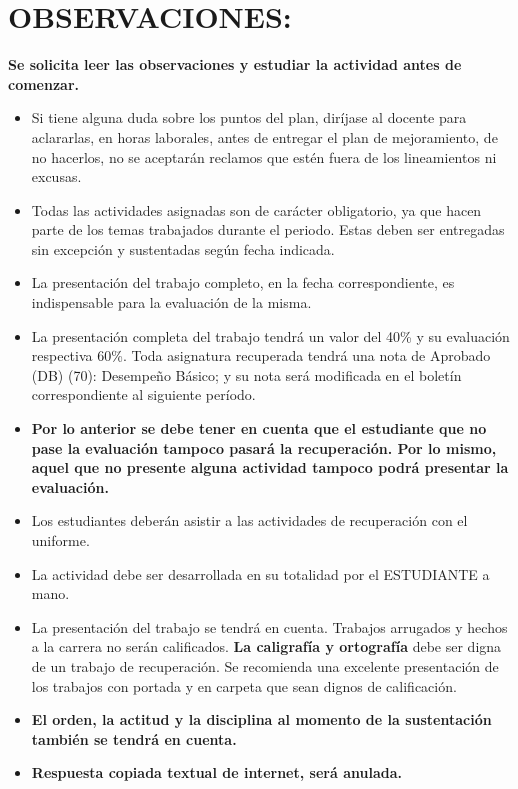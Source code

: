 \documentclass[spanish,12pt,a4paper]{article}
\begin{document}
	\section*{OBSERVACIONES:}
	\textbf{Se solicita leer las observaciones y estudiar la actividad antes de comenzar.}
	\begin{itemize}
		\item Si tiene alguna duda sobre los puntos del plan, diríjase al docente para aclararlas, en horas laborales, antes de entregar el plan de mejoramiento, de no hacerlos, no se aceptarán reclamos que estén fuera de los lineamientos ni excusas.
		
		\item Todas las actividades asignadas son de carácter obligatorio, ya que hacen parte de los temas trabajados durante el periodo. Estas deben ser entregadas sin excepción y sustentadas según fecha indicada.
		
		\item La presentación del trabajo completo, en la fecha correspondiente, es indispensable para la evaluación de la misma.
		
		\item La presentación completa del trabajo tendrá un valor del 40\% y su evaluación respectiva 60\%. Toda asignatura recuperada tendrá una nota de Aprobado (DB) (70): Desempeño Básico; y su nota será modificada en el boletín correspondiente al siguiente período.
		
		\item \textbf{Por lo anterior se debe tener en cuenta que el estudiante que no pase la evaluación tampoco pasará la recuperación. Por lo mismo, aquel que no presente alguna actividad tampoco podrá presentar la evaluación.}
		
		\item Los estudiantes deberán asistir a las actividades de recuperación con el uniforme.
		
		\item La actividad debe ser desarrollada en su totalidad por el ESTUDIANTE a mano.
		
		\item La presentación del trabajo se tendrá en cuenta. Trabajos arrugados y hechos a la carrera no serán calificados. \textbf{La caligrafía y ortografía} debe ser digna de un trabajo de recuperación. Se recomienda una excelente presentación de los trabajos con portada y en carpeta que sean dignos de calificación.
		
		\item \textbf{El orden, la actitud y la disciplina al momento de la sustentación también se tendrá en cuenta.}
		
		\item \textbf{Respuesta copiada textual de internet, será anulada.}
	\end{itemize}
	
\end{document}
